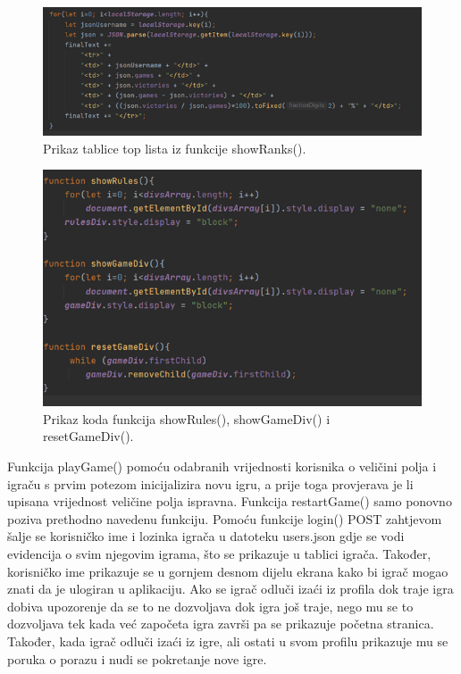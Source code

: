 \begin{figure}[H]
\centering
\includegraphics[width=14cm]{slike-kod/Slika4.png}
\caption{Prikaz tablice top lista iz funkcije showRanks().}
\label{}
\end{figure}


\begin{figure}[H]
\centering
\includegraphics[width=14cm]{slike-kod/Slika5.png}
\caption{Prikaz koda funkcija showRules(), showGameDiv() i resetGameDiv().}
\label{}
\end{figure}





Funkcija playGame() pomoću odabranih vrijednosti korisnika o veličini polja i igraču s prvim potezom inicijalizira novu igru, a prije toga provjerava je li upisana vrijednost veličine polja ispravna. Funkcija restartGame() samo ponovno poziva prethodno navedenu funkciju. Pomoću funkcije login() POST zahtjevom šalje se korisničko ime i lozinka igrača u datoteku users.json gdje se vodi evidencija o svim njegovim igrama, što se prikazuje u tablici igrača. Također, korisničko ime prikazuje se u gornjem desnom dijelu ekrana kako bi igrač mogao znati da je ulogiran u aplikaciju. Ako se igrač odluči izaći iz profila dok traje igra dobiva upozorenje da se to ne dozvoljava dok igra još traje, nego mu se to dozvoljava tek kada već započeta igra završi pa se prikazuje početna stranica. Također, kada igrač odluči izaći iz igre, ali ostati u svom profilu prikazuje mu se poruka o porazu i nudi se pokretanje nove igre. 



